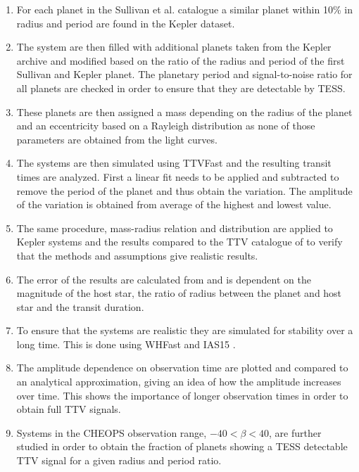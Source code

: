 \documentclass[12pt]{report}
\begin{document}
\begin{enumerate}
	\item For each planet in the Sullivan et al. catalogue a similar planet within 10\% in radius and period are found in the Kepler dataset.
	\item The system are then filled with additional planets taken from the Kepler archive and modified based on the ratio of the radius and period of the first Sullivan and Kepler planet. The planetary period and signal-to-noise ratio for all planets are checked in order to ensure that they are detectable by TESS.
	\item These planets are then assigned a mass depending on the radius of the planet \citep{2015ApJ...809...77S} and an eccentricity based on a Rayleigh distribution as none of those parameters are obtained from the light curves.
	\item The systems are then simulated using TTVFast \citep{2014ApJ...787..132D} and the resulting transit times are analyzed. First a linear fit needs to be applied and subtracted to remove the period of the planet and thus obtain the variation. The amplitude of the variation is obtained from average of the highest and lowest value.
	\item The same procedure, mass-radius relation and  distribution are applied to Kepler systems and the results compared to the TTV catalogue of \cite{2018ApJS..234....9O} to verify that the methods and assumptions give realistic results.
	\item The error of the results are calculated from \cite{2005Sci...307.1288H} and is dependent on the magnitude of the host star, the ratio of radius between the planet and host star and the transit duration.
	\item To ensure that the systems are realistic they are simulated for stability over a long time. This is done using WHFast \citep{2015MNRAS.452..376R} and IAS15 \citep{2015MNRAS.446.1424R}.
	\item The amplitude dependence on observation time are plotted and compared to an analytical approximation, giving an idea of how the amplitude increases over time. This shows the importance of longer observation times in order to obtain full TTV signals.
	\item Systems in the CHEOPS observation range, $-40 < \beta < 40$, are further studied in order to obtain the fraction of planets showing a TESS detectable TTV signal for a given radius and period ratio.
\end{enumerate}
\end{document}
